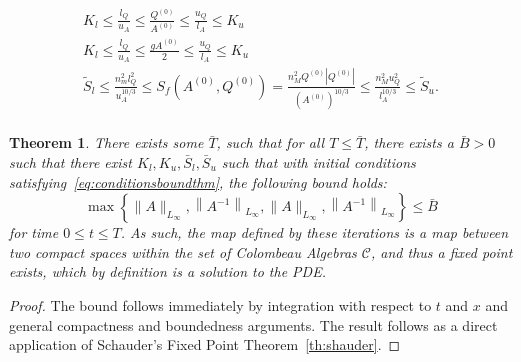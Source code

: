 \documentclass[10pt,a4paper]{amsart}
\newtheorem{theorem}{Theorem}
\begin{document}
\begin{equation}\label{eq:conditionsboundthm}
\begin{array}{l}
K_l\le \frac{l_Q}{u_A}\le \frac{Q^{(0)}}{A^{(0)}} \le \frac{u_Q}{l_A}\le K_u \\
K_l\le \frac{l_Q}{u_A}\le \frac{gA^{(0)}}{2} \le \frac{u_Q}{l_A}\le K_u \\
\tilde{S}_l\le \frac{n_m^2 l^2_Q}{u^{10/3}_A}\le S_f(A^{(0)},Q^{(0)}) = \frac{n_M^2 Q^{(0)}\left\vert Q^{(0)}\right\vert}{(A^{(0)})^{10/3}} \le \frac{n_M^2 u^2_Q}{l^{10/3}_A}\le \tilde{S}_u. \\
\end{array}
\end{equation}

\begin{theorem}
    There exists some $\bar{T}$, such that for all $T\le \bar{T}$, there exists a $\bar{B}>0$ such that there exist $K_l,K_u,\bar{S}_l,\bar{S}_u$ such that with initial conditions satisfying~\eqref{eq:conditionsboundthm}, the following bound holds:
    \begin{equation}
    \max\left\{\|A\|_{L_{\infty}},\left\|A^{-1}\right\|_{L_{\infty}},\|A\|_{L_{\infty}},\left\|A^{-1}\right\|_{L_{\infty}}\right\} \le \bar{B}
    \end{equation}
    for time $0\le t\le T$. As such, the map defined by these iterations is a map between two compact spaces within the set of Colombeau Algebras $\mathcal{C}$, and thus a fixed point exists, which by definition is a solution to the PDE. 
\end{theorem}

\begin{proof}
    The bound follows immediately by integration with respect to $t$ and $x$ and general compactness and boundedness arguments. The result follows as a direct application of Schauder's Fixed Point Theorem~\ref{th:shauder}.
\end{proof}
\end{document}
